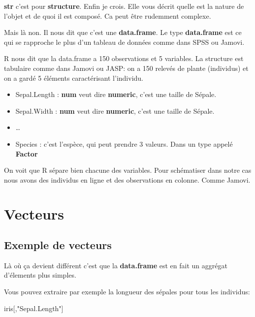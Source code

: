 \documentclass[
]{book}
\newenvironment{Shaded}{\begin{snugshade}}{\end{snugshade}}
\newcommand{\NormalTok}[1]{#1}
\newcommand{\StringTok}[1]{\textcolor[rgb]{0.31,0.60,0.02}{#1}}
\providecommand{\tightlist}{%
  \setlength{\itemsep}{0pt}\setlength{\parskip}{0pt}}
\begin{document}
\textbf{str} c'est pour \textbf{structure}. Enfin je crois. Elle vous décrit quelle est la
nature de l'objet et de quoi il est composé. Ca peut être rudemment complexe.

Mais là non. Il nous dit que c'est une \textbf{data.frame}. Le type \textbf{data.frame}
est ce qui se rapproche le plus d'un tableau de données comme dans SPSS ou Jamovi.

R nous dit que la data.frame a 150 observations et 5 variables. La structure est
tabulaire comme dans Jamovi ou JASP: on a 150 relevés de plante (individus) et
on a gardé 5 éléments caractérisant l'individu.

\begin{itemize}
\tightlist
\item
  Sepal.Length : \textbf{num} veut dire \textbf{numeric}, c'est une taille de Sépale.
\item
  Sepal.Width : \textbf{num} veut dire \textbf{numeric}, c'est une taille de Sépale.
\item
  \ldots{}
\item
  Species : c'est l'espèce, qui peut prendre 3 valeurs. Dans un type appelé
  \textbf{Factor}
\end{itemize}

On voit que R sépare bien chacune des variables. Pour schématiser dans notre cas
nous avons des individus en ligne et des observations en colonne. Comme Jamovi.

\section{Vecteurs}\label{vecteurs}

\subsection{Exemple de vecteurs}\label{exemple-de-vecteurs}

Là où ça devient différent c'est que la \textbf{data.frame} est en fait un aggrégat
d'élements plus simples.

Vous pouvez extraire par exemple la longueur des sépales pour tous les individus:

\begin{Shaded}
\begin{Highlighting}[]
\NormalTok{iris[,}\StringTok{"Sepal.Length"}\NormalTok{]}
\end{Highlighting}
\end{Shaded}
\end{document}

